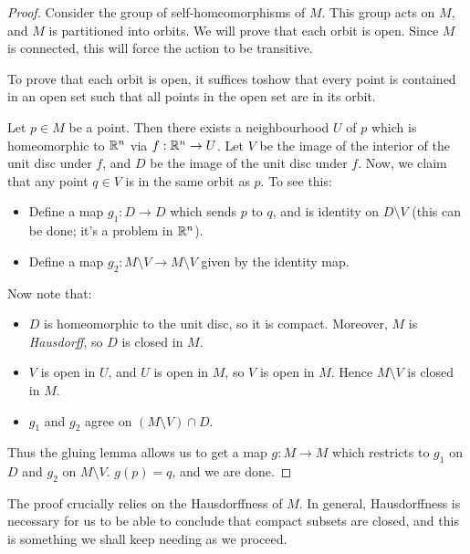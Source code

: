 \documentclass[a4paper]{amsart}
\begin{document}
\begin{proof}
  Consider the group of self-homeomorphisms of $M$. This group acts on
  $M$, and $M$ is partitioned into orbits. We will prove that each
  orbit is open. Since $M$ is connected, this will force the action to
  be transitive.

  To prove that each orbit is open, it suffices toshow that every
  point is contained in an open set such that all points in the open
  set are in its orbit.

  Let $p \in M$ be a point. Then there exists a neighbourhood $U$ of
  $p$ which is homeomorphic to $\mathbb{R}^n$ via $f:\mathbb{R}^n \to U$. Let $V$ be
  the image of the interior of the unit disc under $f$, and $D$ be the
  image of the unit disc under $f$. Now, we claim that any point $q
  \in V$ is in the same orbit as $p$. To see this:

  \begin{itemize}

  \item Define a map $g_1:D \to D$ which sends $p$ to $q$, and is
    identity on $D \setminus V$ (this can be done; it's a problem in
    $\mathbb{R}^n$).

  \item Define a map $g_2:M \setminus V \to M \setminus V$ given by
    the identity map.

  \end{itemize}

  Now note that:

  \begin{itemize}

  \item $D$ is homeomorphic to the unit disc, so it is
    compact. Moreover, $M$ is {\em Hausdorff}, so $D$ is closed in
    $M$.

  \item $V$ is open in $U$, and $U$ is open in $M$, so $V$ is open in
    $M$. Hence $M \setminus V$ is closed in $M$.

  \item $g_1$ and $g_2$ agree on $(M \setminus V) \cap D$.

  \end{itemize}

  Thus the gluing lemma allows us to get a map $g:M \to M$ which
  restricts to $g_1$ on $D$ and $g_2$ on $M \setminus V$. $g(p) = q$,
  and we are done.
\end{proof}

The proof crucially relies on the Hausdorffness of $M$. In general,
Hausdorffness is necessary for us to be able to conclude that compact
subsets are closed, and this is something we shall keep needing as we
proceed.
\end{document}
